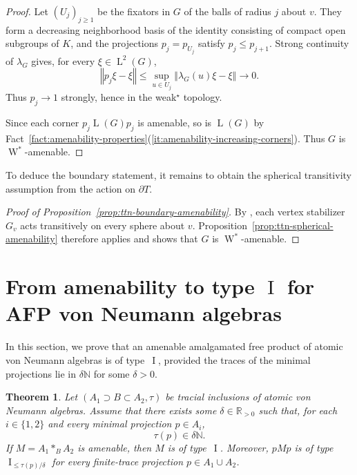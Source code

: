 \documentclass[11pt]{amsart}
\numberwithin{equation}{section}
\newcommand{\nn}{\mathbb N}
\newcommand{\rr}{\mathbb R}
\DeclareMathOperator{\LL}{L}
\DeclareMathOperator{\I}{I}
\newcommand{\norm}[1]{\left\Vert #1\right\Vert}
\newcommand{\Wstar}{\operatorname{W}^*}
\newcommand{\rL}{\operatorname{L}}
\newtheorem{The}{Theorem}[section]
\theoremstyle{definition}
\begin{document}
\begin{proof}
    Let $(U_j)_{j\geq1}$ be the fixators in $G$ of the balls of radius $j$ about $v$. They form a decreasing neighborhood basis of the identity consisting of compact open subgroups of $K$, and the projections $p_j=p_{U_j}$ satisfy $p_j\leq p_{j+1}$. Strong continuity of $\lambda_G$ gives, for every $\xi\in\rL^2(G)$,
    $$
        \norm{p_j\xi-\xi}
        \leq\sup_{u\in U_j}\norm{\lambda_G(u)\xi-\xi}\longrightarrow0.
    $$
    Thus $p_j\to1$ strongly, hence in the weak$^\star$ topology.

    Since each corner $p_j\LL(G)p_j$ is amenable, so is $\LL(G)$ by Fact~\ref{fact:amenability-properties}\textup{(\ref*{it:amenability-increasing-corners})}. Thus $G$ is $\Wstar$-amenable.
\end{proof}

To deduce the boundary statement, it remains to obtain the spherical transitivity assumption from the action on $\partial T$.

\begin{proof}[Proof of Proposition~\ref{prop:ttn-boundary-amenability}]
    By \cite[Lemma~3.1.1]{BM00}, each vertex stabilizer $G_v$ acts transitively on every sphere about $v$. Proposition~\ref{prop:ttn-spherical-amenability} therefore applies and shows that $G$ is $\Wstar$-amenable.
\end{proof}

\section{From amenability to type \texorpdfstring{$\I$}{I} for AFP von Neumann algebras}
\label{sec:atomic-afp}

In this section, we prove that an amenable amalgamated free product of atomic von Neumann algebras is of type~$\I$, provided the traces of the minimal projections lie in $\delta\nn$ for some $\delta>0$.

\begin{The}
    \label{thm:lattice}
    Let $(A_1\supset B\subset A_2,\tau)$ be tracial inclusions of atomic von Neumann algebras. Assume that there exists some $\delta\in\rr_{>0}$ such that, for each $i\in\{1,2\}$ and every minimal projection $p\in A_i$,
    \begin{equation}\label{eq:lattice-hypothesis}
        \tau(p)\in\delta\nn.
    \end{equation}
    If $M=A_1\ast_B A_2$ is amenable, then $M$ is of type~$\I$. Moreover, $pMp$ is of type $\I_{\leq\tau(p)/\delta}$ for every finite-trace projection $p\in A_1\cup A_2$.
\end{The}
\end{document}
